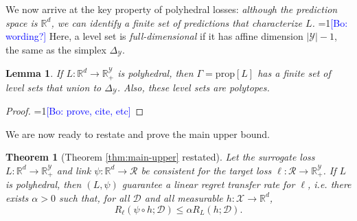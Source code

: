 \documentclass{article}
\newtheorem{theorem}{Theorem}
\newtheorem{lemma}{Lemma}
\newcommand{\Comments}{1}
\newcommand{\mynote}[2]{\ifnum\Comments=1\textcolor{#1}{#2}\fi}
\newcommand{\bo}[1]{\mynote{blue}{[Bo: #1]}}
\newcommand{\reals}{\mathbb{R}}
\newcommand{\prop}[1]{\mathrm{prop}[#1]}
\newcommand{\simplex}{\Delta_\Y}
\newcommand{\D}{\mathcal{D}}
\newcommand{\R}{\mathcal{R}}
\newcommand{\X}{\mathcal{X}}
\newcommand{\Y}{\mathcal{Y}}
\begin{document}
We now arrive at the key property of polyhedral losses: \emph{although the prediction space is $\reals^d$, we can identify a finite set of predictions that characterize $L$.} \bo{wording?}
Here, a level set is \emph{full-dimensional} if it has affine dimension $|\Y|-1$, the same as the simplex $\simplex$.
\begin{lemma} \label{lemma:polyhedral-finite}
  If $L: \reals^d \to \reals_+^{\Y}$ is polyhedral, then $\Gamma = \prop{L}$ has a finite set of level sets that union to $\simplex$. Also, these level sets are polytopes.
\end{lemma}
\begin{proof}
  \bo{prove, cite, etc}
\end{proof}

We are now ready to restate and prove the main upper bound.
\begin{theorem}[Theorem \ref{thm:main-upper} restated]
  Let the surrogate loss $L: \reals^d \to \reals_+^{\Y}$ and link $\psi: \reals^d \to \R$ be consistent for the target loss $\ell: \R \to \reals_+^{\Y}$.
  If $L$ is polyhedral, then $(L,\psi)$ guarantee a linear regret transfer rate for $\ell$, i.e. there exists $\alpha > 0$ such that, for all $\D$ and all measurable $h: \X \to \reals^d$,
    \[ R_{\ell}(\psi \circ h ; \D) \leq \alpha R_L(h ; \D) . \]
\end{theorem}
\end{document}
